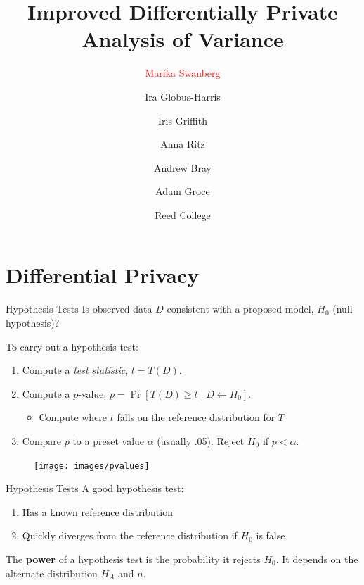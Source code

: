 \documentclass{beamer}
\title[Improved Private ANOVA]{Improved Differentially Private Analysis of Variance}
\author[Marika Swanberg]{\textcolor{red}{Marika Swanberg} \and Ira Globus-Harris \and Iris Griffith \and \newline Anna Ritz \and  Andrew Bray \and Adam Groce}
\date{Reed College}
\begin{document}
\begin{frame}
\titlepage
\end{frame}


\section{Differential Privacy}

\begin{frame}{Hypothesis Tests}
Is observed data $D$ consistent with a proposed model, $H_0$ (null hypothesis)?\pause

\bigskip
To carry out a hypothesis test: 
\pause
\begin{enumerate}
\item Compute a \textit{test statistic}, $t = T(D)$. \pause
\item Compute a $p$-value, $p = \Pr[T(D) \geq t \mid  D \leftarrow H_0]$. 
\begin{itemize}
\item Compute where $t$ falls on the reference distribution for $T$ \pause
\end{itemize}
\item Compare $p$ to a preset value $\alpha$ (usually .05). Reject $H_0$ if $p < \alpha$.
\end{enumerate}
\begin{figure}
  \texttt{[image: images/pvalues]}
\end{figure}
\end{frame}


\begin{frame}{Hypothesis Tests}
A good hypothesis test: \pause
\begin{enumerate}
    \item Has a known reference distribution \pause
    \item Quickly diverges from the reference distribution if $H_0$ is false
\end{enumerate}
\pause
\begin{definition}[Power]
The \textbf{power} of a hypothesis test is the probability it rejects $H_0$.  It depends on the alternate distribution $H_A$ and $n$.
\end{definition}
\end{frame}
\end{document}
